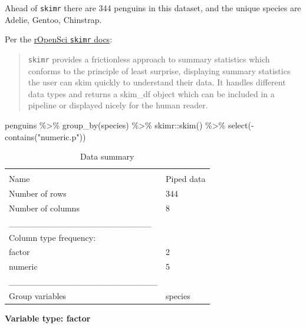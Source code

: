 \documentclass[
]{article}
\newenvironment{Shaded}{\begin{snugshade}}{\end{snugshade}}
\newcommand{\FunctionTok}[1]{\textcolor[rgb]{0.00,0.00,0.00}{#1}}
\newcommand{\NormalTok}[1]{#1}
\newcommand{\SpecialCharTok}[1]{\textcolor[rgb]{0.00,0.00,0.00}{#1}}
\newcommand{\StringTok}[1]{\textcolor[rgb]{0.31,0.60,0.02}{#1}}
\begin{document}
Ahead of \texttt{skimr} there are 344 penguins in this dataset, and the
unique species are Adelie, Gentoo, Chinstrap.

Per the \href{https://docs.ropensci.org/skimr/index.html}{rOpenSci
\texttt{skimr} docs}:

\begin{quote}
\texttt{skimr} provides a frictionless approach to summary statistics
which conforms to the principle of least surprise, displaying summary
statistics the user can skim quickly to understand their data. It
handles different data types and returns a skim\_df object which can be
included in a pipeline or displayed nicely for the human reader.
\end{quote}

\begin{Shaded}
\begin{Highlighting}[]
\NormalTok{penguins }\SpecialCharTok{\%\textgreater{}\%} 
  \FunctionTok{group\_by}\NormalTok{(species) }\SpecialCharTok{\%\textgreater{}\%} 
\NormalTok{  skimr}\SpecialCharTok{::}\FunctionTok{skim}\NormalTok{() }\SpecialCharTok{\%\textgreater{}\%} 
  \FunctionTok{select}\NormalTok{(}\SpecialCharTok{{-}}\FunctionTok{contains}\NormalTok{(}\StringTok{"numeric.p"}\NormalTok{))}
\end{Highlighting}
\end{Shaded}

\begin{longtable}[]{@{}ll@{}}
\caption{Data summary}\tabularnewline
\toprule
& \\
\midrule
\endfirsthead
\toprule
& \\
\midrule
\endhead
Name & Piped data \\
Number of rows & 344 \\
Number of columns & 8 \\
\_\_\_\_\_\_\_\_\_\_\_\_\_\_\_\_\_\_\_\_\_\_\_ & \\
Column type frequency: & \\
factor & 2 \\
numeric & 5 \\
\_\_\_\_\_\_\_\_\_\_\_\_\_\_\_\_\_\_\_\_\_\_\_\_ & \\
Group variables & species \\
\bottomrule
\end{longtable}

\textbf{Variable type: factor}
\end{document}
